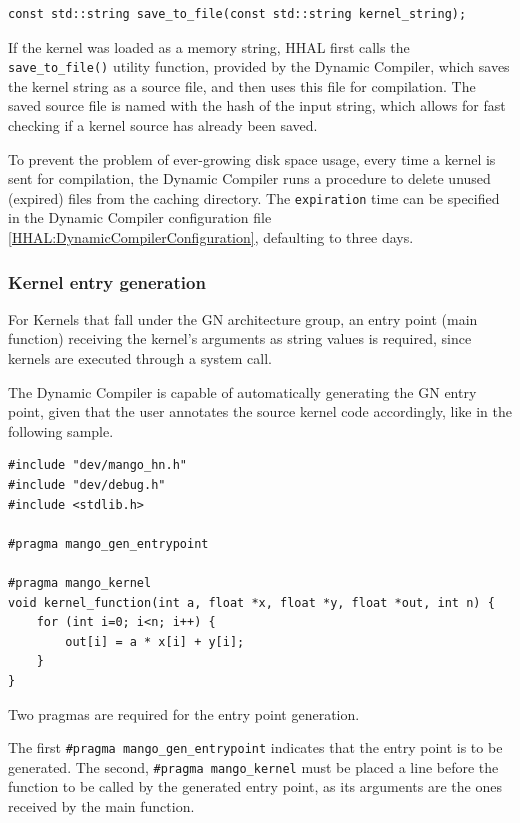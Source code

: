 \begin{lstlisting}[style=CStyle, caption=HHAL Dynamic Compiler - Save kernel string to file]
const std::string save_to_file(const std::string kernel_string);
\end{lstlisting}

If the kernel was loaded as a memory string, HHAL first calls the \texttt{save\_to\_file()} utility function, provided by the Dynamic Compiler, which saves the kernel string as a source file, and then uses this file for compilation. The saved source file is named with the hash of the input string, which allows for fast checking if a kernel source has already been saved.

To prevent the problem of ever-growing disk space usage, every time a kernel is sent for compilation, the Dynamic Compiler runs a procedure to delete unused (expired) files from the caching directory. The \texttt{expiration} time can be specified in the Dynamic Compiler configuration file \ref{HHAL:DynamicCompilerConfiguration}, defaulting to three days.

\subsubsection{Kernel entry generation}

For Kernels that fall under the GN architecture group, an entry point (main function) receiving the kernel's arguments as string values is required, since kernels are executed through a system call.

The Dynamic Compiler is capable of automatically generating the GN entry point, given that the user annotates the source kernel code accordingly, like in the following sample.

\begin{lstlisting}[style=CStyle, caption=HHAL Dynamic Compiler - Kernel source annotation sample]
#include "dev/mango_hn.h"
#include "dev/debug.h"
#include <stdlib.h>

#pragma mango_gen_entrypoint

#pragma mango_kernel
void kernel_function(int a, float *x, float *y, float *out, int n) {
    for (int i=0; i<n; i++) {
	    out[i] = a * x[i] + y[i];
    }
}
\end{lstlisting}

Two pragmas are required for the entry point generation. 

The first \texttt{\#pragma mango\_gen\_entrypoint} indicates that the entry point is to be generated. The second, \texttt{\#pragma mango\_kernel} must be placed a line before the function to be called by the generated entry point, as its arguments are the ones received by the main function.

